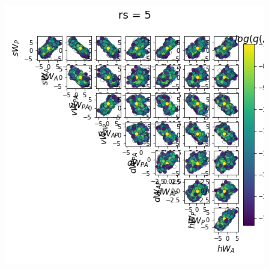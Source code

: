 \documentclass[11pt]{article}
\begin{document}
\begin{center}
\includegraphics[scale=0.33]{figs/Z_SC_pvar_full_c=0_p=80_rs=5.png}
\end{center}
\end{document}
